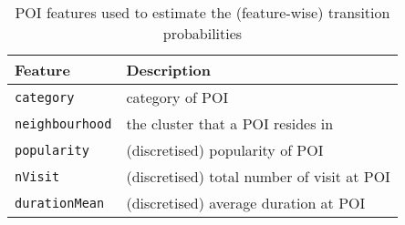 \begin{table}[ht]
\caption{POI features used to estimate the (feature-wise) transition probabilities}
\label{tab:tranfeature}
\centering
\begin{tabular}{l|l} \hline
\textbf{Feature}       & \textbf{Description} \\ \hline
\texttt{category}      & category of POI \\
\texttt{neighbourhood} & the cluster that a POI resides in \\
\texttt{popularity}    & (discretised) popularity of POI \\
\texttt{nVisit}        & (discretised) total number of visit at POI \\
\texttt{durationMean}  & (discretised) average duration at POI \\ \hline
\end{tabular}
\end{table}

